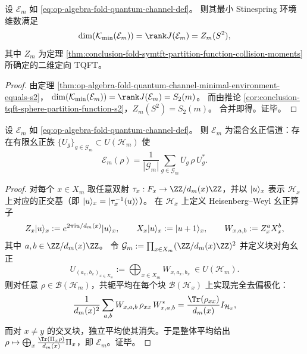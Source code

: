 \begin{corollary}\label{cor:op-algebra-fold-quantum-channel-minenv-equals-sphere-partition-function}
设 \(\mathcal{E}_m\) 如 \eqref{eq:op-algebra-fold-quantum-channel-def}。
则其最小 Stinespring 环境维数满足
\[
\dim(\mathcal{K}_{\min}(\mathcal{E}_m))=\rank J(\mathcal{E}_m)=Z_m(S^2),
\]
其中 \(Z_m\) 为定理 \ref{thm:conclusion-fold-symtft-partition-function-collision-moments} 所确定的二维定向 TQFT。
\end{corollary}
\begin{proof}
由定理 \ref{thm:op-algebra-fold-quantum-channel-minimal-environment-equals-s2}，
\(
\dim(\mathcal{K}_{\min}(\mathcal{E}_m))=\rank J(\mathcal{E}_m)=S_2(m)
\)。
而由推论 \ref{cor:conclusion-tqft-sphere-partition-function-s2}，\(Z_m(S^2)=S_2(m)\)。
合并即得。证毕。
\end{proof}

\begin{proposition}[折叠信道的显式混合幺正实现]\label{prop:op-algebra-fold-quantum-channel-mixed-unitary}
设 \(\mathcal{E}_m\) 如 \eqref{eq:op-algebra-fold-quantum-channel-def}。
则 \(\mathcal{E}_m\) 为混合幺正信道：存在有限幺正族 \(\{U_g\}_{g\in\mathcal{G}_m}\subset U(\mathcal{H}_m)\) 使
\[
\mathcal{E}_m(\rho)=\frac{1}{|\mathcal{G}_m|}\sum_{g\in\mathcal{G}_m}U_g\,\rho\,U_g^\ast.
\]
\end{proposition}
\begin{proof}
对每个 \(x\in X_m\) 取任意双射 \(\tau_x:F_x\to\ZZ/d_m(x)\ZZ\)，并以 \(\lvert u\rangle_x\) 表示 \(\mathcal{H}_x\) 上对应的正交基（即 \(\lvert u\rangle_x=\lvert \tau_x^{-1}(u)\rangle\)）。
在 \(\mathcal{H}_x\) 上定义 Heisenberg--Weyl 幺正算子
\[
Z_x\lvert u\rangle_x:=e^{2\pi\mathrm{i}u/d_m(x)}\lvert u\rangle_x,
\qquad
X_x\lvert u\rangle_x:=\lvert u+1\rangle_x,
\qquad
W_{x,a,b}:=Z_x^{a}X_x^{b},
\]
其中 \(a,b\in\ZZ/d_m(x)\ZZ\)。
令
\(
\mathcal{G}_m:=\prod_{x\in X_m}(\ZZ/d_m(x)\ZZ)^2
\)
并定义块对角幺正
\[
U_{(a_x,b_x)_{x\in X_m}}:=\bigoplus_{x\in X_m}W_{x,a_x,b_x}\ \in U(\mathcal{H}_m).
\]
则对任意 \(\rho\in\mathcal{B}(\mathcal{H}_m)\)，共轭平均在每个块 \(\mathcal{B}(\mathcal{H}_x)\) 上实现完全去偏极化：
\[
\frac{1}{d_m(x)^2}\sum_{a,b}W_{x,a,b}\,\rho_{xx}\,W_{x,a,b}^\ast=\frac{\Tr(\rho_{xx})}{d_m(x)}I_{\mathcal{H}_x},
\]
而对 \(x\neq y\) 的交叉块，独立平均使其消失。于是整体平均给出
\(
\rho\mapsto \bigoplus_x \frac{\Tr(\Pi_x\rho)}{d_m(x)}\Pi_x
\)，即 \(\mathcal{E}_m\)。证毕。
\end{proof}

